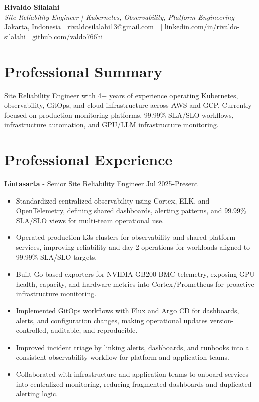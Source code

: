\documentclass[10pt,a4paper]{article}
\begin{document}

{\LARGE \textbf{Rivaldo Silalahi}}\\[2pt]
\textit{Site Reliability Engineer | Kubernetes, Observability, Platform Engineering}\\[4pt]
Jakarta, Indonesia \quad|\quad
\href{mailto:rivaldosilalahi13@gmail.com}{rivaldosilalahi13@gmail.com} \quad|\quad
\href{tel:PHONE_NUMBER_PLACEHOLDER}{\texttt{}} \quad|\quad
\href{https://www.linkedin.com/in/rivaldo-silalahi/}{linkedin.com/in/rivaldo-silalahi} \quad|\quad
\href{https://github.com/valdo766hi}{github.com/valdo766hi}


\section*{Professional Summary}

Site Reliability Engineer with 4+ years of experience operating Kubernetes, observability, GitOps, and cloud infrastructure across AWS and GCP. Currently focused on production monitoring platforms, 99.99\% SLA/SLO workflows, infrastructure automation, and GPU/LLM infrastructure monitoring.


\section*{Professional Experience}

\textbf{Lintasarta} - Senior Site Reliability Engineer \hfill Jul 2025-Present

\begin{itemize}[leftmargin=*]
  \item Standardized centralized observability using Cortex, ELK, and OpenTelemetry, defining shared dashboards, alerting patterns, and 99.99\% SLA/SLO views for multi-team operational use.
  \item Operated production k3s clusters for observability and shared platform services, improving reliability and day-2 operations for workloads aligned to 99.99\% SLA/SLO targets.
  \item Built Go-based exporters for NVIDIA GB200 BMC telemetry, exposing GPU health, capacity, and hardware metrics into Cortex/Prometheus for proactive infrastructure monitoring.
  \item Implemented GitOps workflows with Flux and Argo CD for dashboards, alerts, and configuration changes, making operational updates version-controlled, auditable, and reproducible.
  \item Improved incident triage by linking alerts, dashboards, and runbooks into a consistent observability workflow for platform and application teams.
  \item Collaborated with infrastructure and application teams to onboard services into centralized monitoring, reducing fragmented dashboards and duplicated alerting logic.
\end{itemize}
\end{document}
